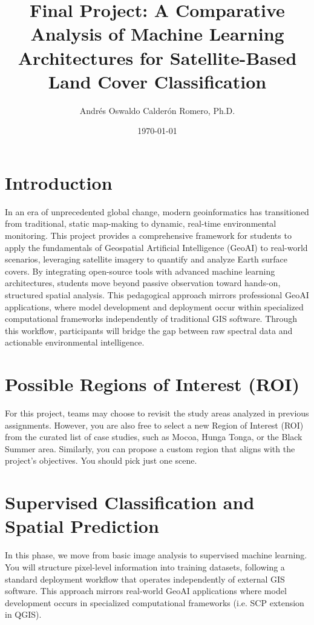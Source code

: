 \documentclass{article}
\title{Final Project: A Comparative Analysis of Machine Learning Architectures for Satellite-Based Land Cover Classification}
\author{Andrés Oswaldo Calderón Romero, Ph.D.}
\date{\today}
\begin{document}
\maketitle

\section{Introduction}
In an era of unprecedented global change, modern geoinformatics has transitioned from traditional, static map-making to dynamic, real-time environmental monitoring. This project provides a comprehensive framework for students to apply the fundamentals of Geospatial Artificial Intelligence (GeoAI) to real-world scenarios, leveraging satellite imagery to quantify and analyze Earth surface covers.  By integrating open-source tools with advanced machine learning architectures, students move beyond passive observation toward hands-on, structured spatial analysis. This pedagogical approach mirrors professional GeoAI applications, where model development and deployment occur within specialized computational frameworks independently of traditional GIS software. Through this workflow, participants will bridge the gap between raw spectral data and actionable environmental intelligence.

\section{Possible Regions of Interest (ROI)}
For this project, teams may choose to revisit the study areas analyzed in previous assignments. However, you are also free to select a new Region of Interest (ROI) from the curated list of case studies, such as Mocoa, Hunga Tonga, or the Black Summer area.  Similarly, you can propose a custom region that aligns with the project’s objectives.  You should pick just one scene.

\section{Supervised Classification and Spatial Prediction}
In this phase, we move from basic image analysis to supervised machine learning. You will structure pixel-level information into training datasets, following a standard deployment workflow that operates independently of external GIS software. This approach mirrors real-world GeoAI applications where model development occurs in specialized computational frameworks (i.e. SCP extension in QGIS).
\end{document}
